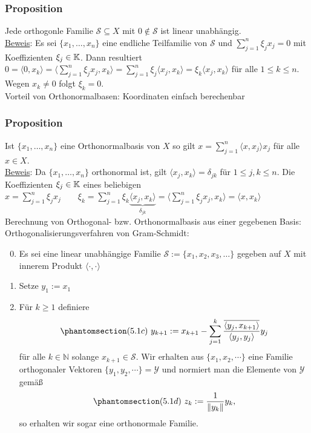 \subsubsection{Proposition}
Jede orthogonle Familie $\mathcal{S}\subseteq X$ mit $0\notin\mathcal{S}$ ist linear unabhängig.\\
\underline{Beweis}: Es sei $\{x_1,\dots,x_n\}$ eine endliche Teilfamilie von $\mathcal{S}$ und $\sum_{j=1}^n \xi_j x_j =0$ mit Koeffizienten $\xi_j\in\mathbb{K}$.
Dann resultiert $0=\langle 0,x_k\rangle=\langle\sum_{j=1}^n\xi_j x_j,x_k\rangle=\sum_{j=1}^n \xi_j \langle x_j,x_k\rangle=\xi_k\langle x_j,x_k\rangle$ für alle $1\leq k\leq n$. Wegen $x_k\neq 0$ folgt $\xi_k=0$.\\
Vorteil von Orthonormalbasen: Koordinaten einfach berechenbar
\subsubsection{Proposition}
Ist $\{x_1,\dots,x_n\}$ eine Orthonormalbasis von $X$ so gilt $x=\sum_{j=1}^n \langle x,x_j\rangle x_j$ für alle $x\in X$.\\
\underline{Beweis}: Da $\{x_1,\dots,x_n\}$ orthonormal ist, gilt $\langle x_j,x_k\rangle=\delta_{jk}$ für $1\leq j,k\leq n$. Die Koeffizienten $\xi_j\in\mathbb{K}$ eines beliebigen $x=\sum_{j=1}^n\xi_j x_j \qquad \xi_k=\sum_{j=1}^n\xi_k \underbrace{\langle x_j,x_k\rangle}_{\delta_{jk}}=\langle\sum_{j=1}^n\xi_j x_j,x_k\rangle=\langle x,x_k\rangle$\\
Berechnung von Orthogonal- bzw. Orthonormalbasis aus einer gegebenen Basis: Orthogonalisierungsverfahren von Gram-Schmidt:

\numbers
\begin{enumerate}
\setcounter{enumi}{-1}
\item Es sei eine linear unabhängige Familie $\mathcal{S}:=\{x_1,x_2,x_3,\dots\}$ gegeben auf $X$ mit innerem Produkt $\langle \cdot,\cdot\rangle$
\item Setze $y_1:=x_1$
\item Für $k\geq 1$ definiere
\[\phantomsection\label{5.1c}(5.1c)\ y_{k+1}:=x_{k+1}-\sum _{j=1}^k \frac{\overline{\langle y_j,x_{k+1}\rangle}}{\langle y_j,y_j\rangle}y_j\]
für alle $k\in \mathbb{N}$ solange $x_{k+1}\in\mathcal{S}$.  Wir erhalten aus $\{x_1,x_2,\cdots \}$ eine Familie orthogonaler Vektoren $\{y_1,y_2,\cdots \}=\mathcal{Y}$ und normiert man die Elemente von $\mathcal{Y}$ gemäß
\[\phantomsection\label{5.1d}(5.1d)\ z_k:=\frac{1}{\|y_k\|}y_k,\]
so erhalten wir sogar eine orthonormale Familie.
\end{enumerate}
